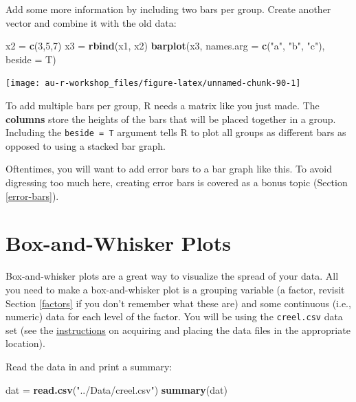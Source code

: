 \documentclass[]{book}
\newenvironment{Shaded}{\begin{snugshade}}{\end{snugshade}}
\newcommand{\DataTypeTok}[1]{\textcolor[rgb]{0.13,0.29,0.53}{#1}}
\newcommand{\DecValTok}[1]{\textcolor[rgb]{0.00,0.00,0.81}{#1}}
\newcommand{\KeywordTok}[1]{\textcolor[rgb]{0.13,0.29,0.53}{\textbf{#1}}}
\newcommand{\NormalTok}[1]{#1}
\newcommand{\StringTok}[1]{\textcolor[rgb]{0.31,0.60,0.02}{#1}}
\begin{document}
Add some more information by including two bars per group. Create another vector and combine it with the old data:

\begin{Shaded}
\begin{Highlighting}[]
\NormalTok{x2 =}\StringTok{ }\KeywordTok{c}\NormalTok{(}\DecValTok{3}\NormalTok{,}\DecValTok{5}\NormalTok{,}\DecValTok{7}\NormalTok{)}
\NormalTok{x3 =}\StringTok{ }\KeywordTok{rbind}\NormalTok{(x1, x2)}
\KeywordTok{barplot}\NormalTok{(x3, }\DataTypeTok{names.arg =} \KeywordTok{c}\NormalTok{(}\StringTok{"a"}\NormalTok{, }\StringTok{"b"}\NormalTok{, }\StringTok{"c"}\NormalTok{), }\DataTypeTok{beside =}\NormalTok{ T)}
\end{Highlighting}
\end{Shaded}

\begin{center}\texttt{[image: au-r-workshop\_files/figure-latex/unnamed-chunk-90-1]} \end{center}

To add multiple bars per group, R needs a matrix like you just made. The \textbf{columns} store the heights of the bars that will be placed together in a group. Including the \texttt{beside\ =\ T} argument tells R to plot all groups as different bars as opposed to using a stacked bar graph.

Oftentimes, you will want to add error bars to a bar graph like this. To avoid digressing too much here, creating error bars is covered as a bonus topic (Section \ref{error-bars}).

\hypertarget{box-whisker}{%
\section{Box-and-Whisker Plots}\label{box-whisker}}

Box-and-whisker plots are a great way to visualize the spread of your data. All you need to make a box-and-whisker plot is a grouping variable (a factor, revisit Section \ref{factors} if you don't remember what these are) and some continuous (i.e., numeric) data for each level of the factor. You will be using the \texttt{creel.csv} data set (see the \protect\hyperlink{data-sets}{instructions} on acquiring and placing the data files in the appropriate location).

Read the data in and print a summary:

\begin{Shaded}
\begin{Highlighting}[]
\NormalTok{dat =}\StringTok{ }\KeywordTok{read.csv}\NormalTok{(}\StringTok{"../Data/creel.csv"}\NormalTok{)}
\KeywordTok{summary}\NormalTok{(dat)}
\end{Highlighting}
\end{Shaded}
\end{document}
